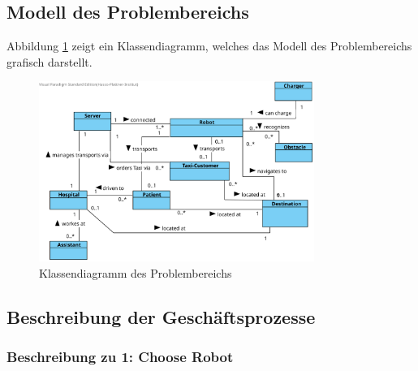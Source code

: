 
		
		
		
		\subsection{Modell des Problembereichs}
		Abbildung \ref{fig:2-3-modell-problembereich} zeigt ein Klassendiagramm, welches das Modell des Problembereichs grafisch darstellt.
		\begin{figure}[H]
			\centering
			\includegraphics[width=0.8\textwidth]{img/1-Analyse-2}
			\caption{Klassendiagramm des Problembereichs}
			\label{fig:2-3-modell-problembereich}
		\end{figure}

		\subsection{Beschreibung der Geschäftsprozesse}

			\subsubsection{Beschreibung zu 1: Choose Robot}

